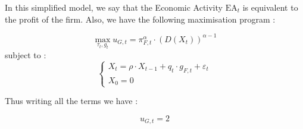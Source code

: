 \documentclass{article}
\begin{document}
In this simplified model, we say that the Economic Activity $\text{EA}_{t}$ is equivalent to the profit of the firm. Also, we have the following maximisation program : 

$$\max_{\tau_{t},g_{t}}{u_{G,t}=\pi_{F,t}^\alpha\cdot\left(D(X_{t})\right)^{\alpha-1}}$$
subject to : 
\begin{equation*}
    \begin{cases}
        X_t=\rho\cdot X_{t-1}+q_{t}\cdot g_{F,t}+\varepsilon_{t} \\
        X_0=0
    \end{cases}
\end{equation*}

Thus writing all the terms we have : 

$$u_{G,t}=2$$
\end{document}
